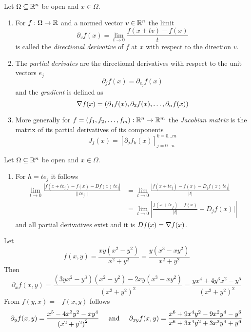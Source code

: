 \begin{definition}
    Let \( \Omega \subseteq \mathbb{R}^n \) be open and \( x \in \Omega \).
    \begin{enumerate}
        \item For \( f: \Omega \to \mathbb{R} \) and a normed vector \( v \in \mathbb{R}^n \) the limit
              \[
                  \partial_v f(x) = \lim_{t \to 0} \frac{f(x + tv) - f(x)}{t}
              \]
              is called the \emph{directional derivative} of \( f \) at \( x \)
              with respect to the direction \( v \).
        \item The \emph{partial derivates} are the directional derivatives with respect to the
              unit vectors \( e_j \)
              \[
                  \partial_j f(x) = \partial_{e_j} f(x)
              \]
              and the \emph{gradient} is defined as
              \[
                  \nabla f(x) = \left( \partial_1 f(x), \partial_2 f(x), \dots, \partial_n f(x) \right)
              \]
        \item More generally for \( f = (f_1, f_2, \dots, f_m): \mathbb{R}^n \to \mathbb{R}^m \) the \emph{Jacobian matrix}
              is the matrix of its partial derivatives of its components
              \[
                  J_f(x) = {\left[ \partial_j f_k(x) \right]}_{j=0 \dots n}^{k=0 \dots m}
              \]
    \end{enumerate}
\end{definition}
\bigskip


\begin{remarks}
    Let \( \Omega \subseteq \mathbb{R}^n \) be open and \( x \in \Omega \).
    \begin{enumerate}
        \item For \( h = te_j \) it follows
              \[
                  \begin{split}
                      \lim_{t \to 0} \frac{|f(x + te_j) - f(x) - Df(x)\,te_j|}{\|te_j\|}
                      & = \lim_{t \to 0} \frac{|f(x + te_j) - f(x) - D_j f(x)\,te_j|}{|t|} \\
                      & = \lim_{t \to 0} \left| \frac{f(x + te_j) - f(x)}{|t|} - D_j f(x)| \right|
                  \end{split}
              \]
              and all partial derivatives exist and it is \( Df(x) = \nabla f(x) \).
    \end{enumerate}
\end{remarks}
\bigskip


\begin{example}
    Let
    \[
        f(x,y) = \frac{xy(x^2 - y^2)}{x^2 + y^2} = \frac{y(x^3 - xy^2)}{x^2 + y^2}
    \]
    Then
    \[
        \partial_x f(x,y)
        = \frac{(3yx^2 - y^3)(x^2 - y^2) - 2xy(x^3 - xy^2)}{{(x^2 + y^2)}^2}
        = \frac{yx^4 + 4y^3x^2 - y^5}{{(x^2 + y^2)}^2}
    \]
    From \( f(y,x) = - f(x,y)\)  follows
    \[
        \partial_y f(x,y) = \frac{x^5 - 4x^3y^2 - xy^4}{{(x^2 + y^2)}^2} \mspace{25mu}\text{and}\mspace{25mu}
        \partial_{xy} f(x,y) =
        \frac{x^{6} + 9 x^{4} y^{2} - 9 x^{2} y^{4} - y^{6}}{x^{6} + 3 x^{4} y^{2} + 3 x^{2} y^{4} + y^{6}}
    \]
\end{example}
\bigskip


